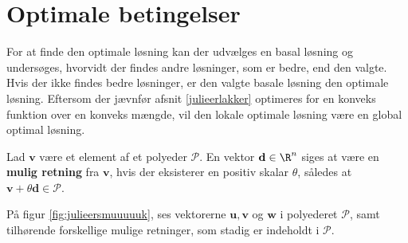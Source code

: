 \section{Optimale betingelser}
\label{julieerfantalastiskogvidunderlig}
%
For at finde den optimale løsning kan der udvælges en basal løsning og undersøges, hvorvidt der findes andre løsninger, som er bedre, end den valgte. 
Hvis der ikke findes bedre løsninger, er den valgte basale løsning den optimale løsning. 
Eftersom der jævnfør afsnit \ref{julieerlakker} optimeres for en konveks funktion over en konveks mængde, %
vil den lokale optimale løsning være en global optimal løsning. 
%
%
\begin{defn}{}{}
Lad $\textbf{v}$ være et element af et polyeder $\mathcal{P}$.
En vektor $\textbf{d}\in \R^n$ siges at være en \textbf{mulig retning} fra $\textbf{v}$, hvis der eksisterer en positiv skalar $\theta$, således at $\textbf{v}+\theta \textbf{d}\in \mathcal{P}$.
\end{defn}
\noindent
%
På figur \ref{fig:julieersmuuuuuk}, ses vektorerne $\mathbf{u}, \mathbf{v}$ og $\mathbf{w}$ i polyederet $\mathcal{P}$, samt tilhørende forskellige mulige retninger, som stadig er indeholdt i $\mathcal{P}$.
%

%
%
